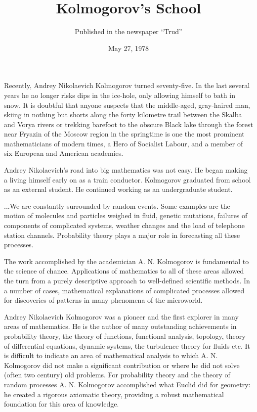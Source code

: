 \documentclass{article}
\begin{document}
\title{Kolmogorov's School}
\date{May 27, 1978}
\author{Published in the newspaper ``Trud''}
\maketitle
Recently, Andrey Nikolaevich Kolmogorov turned seventy-five.
In the last several years he no longer risks dips in the ice-hole, only allowing himself to bath in snow.
It is doubtful that anyone suspects that the middle-aged, gray-haired man, skiing in nothing but shorts along the forty kilometre trail between the Skalba and Vorya rivers or trekking barefoot to the obscure Black lake through the forest near Fryazin of the Moscow region in the springtime is one the most prominent mathematicians of modern times, a Hero of Socialist Labour, and a member of six European and American academies.

Andrey Nikolaevich's road into big mathematics was not easy.
He began making a living himself early on as a train conductor.
Kolmogorov graduated from school as an external student.
He continued working as an undergraduate student.

...We are constantly surrounded by random events.
Some examples are the motion of molecules and particles weighed in fluid, genetic mutations, failures of components of complicated systems, weather changes and the load of telephone station channels.
Probability theory plays a major role in forecasting all these processes.

The work accomplished by the academician A. N. Kolmogorov is fundamental to the science of chance.
Applications of mathematics to all of these areas allowed the turn from a purely descriptive approach to well-defined scientific methods.
In a number of cases, mathematical explanations of complicated processes allowed for discoveries of patterns in many phenomena of the microworld.

Andrey Nikolaevich Kolmogorov was a pioneer and the first explorer in many areas of mathematics.
He is the author of many outstanding achievements in probability theory, the theory of functions, functional analysis, topology, theory of differential equations, dynamic systems, the turbulence theory for fluids etc.
It is difficult to indicate an area of mathematical analysis to which A. N. Kolmogorov did not make a significant contribution or where he did not solve (often two century) old problems.
For probability theory and the theory of random processes A. N. Kolmogorov accomplished what Euclid did for geometry: he created a rigorous axiomatic theory, providing a robust mathematical foundation for this area of knowledge.
\end{document}
